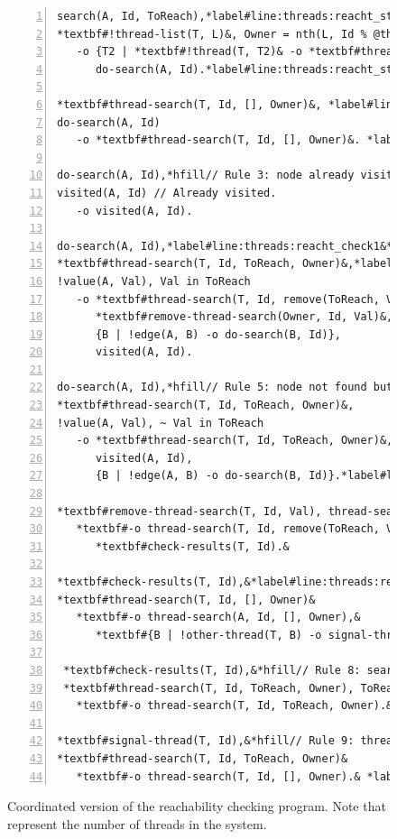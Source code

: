 \begin{figure}[h]
\begin{Verbatim}[numbers=left,fontsize=\codesize,commandchars=*\#\&]
search(A, Id, ToReach),*label#line:threads:reacht_start1&*hfill// Rule 1: initialize search
*textbf#!thread-list(T, L)&, Owner = nth(L, Id % @threads) // Allocate search to a thread.
   -o {T2 | *textbf#!thread(T, T2)& -o *textbf#thread-search(T2, Id, ToReach, Owner)&},*label#line:threads:reacht_threads&
      do-search(A, Id).*label#line:threads:reacht_start2&

*textbf#thread-search(T, Id, [], Owner)&, *label#line:threads:reacht_prune1&*hfill// Rule 2: search completed
do-search(A, Id)
   -o *textbf#thread-search(T, Id, [], Owner)&. *label#line:threads:reacht_prune2&

do-search(A, Id),*hfill// Rule 3: node already visited
visited(A, Id) // Already visited.
   -o visited(A, Id).

do-search(A, Id),*label#line:threads:reacht_check1&*label#line:bfs_join1&*hfill// Rule 4: node found
*textbf#thread-search(T, Id, ToReach, Owner)&,*label#line:threads:reacht_join2&
!value(A, Val), Val in ToReach
   -o *textbf#thread-search(T, Id, remove(ToReach, Val), Owner)&,
      *textbf#remove-thread-search(Owner, Id, Val)&, // Tell owner thread about it.*label#line:threads:reacht_remove&
      {B | !edge(A, B) -o do-search(B, Id)},
      visited(A, Id).

do-search(A, Id),*hfill// Rule 5: node not found but propagate search
*textbf#thread-search(T, Id, ToReach, Owner)&,
!value(A, Val), ~ Val in ToReach
   -o *textbf#thread-search(T, Id, ToReach, Owner)&,
      visited(A, Id),
      {B | !edge(A, B) -o do-search(B, Id)}.*label#line:threads:reacht_check2&

*textbf#remove-thread-search(T, Id, Val), thread-search(T, Id, ToReach, Owner)&*hfill// Rule 6: node found
   *textbf#-o thread-search(T, Id, remove(ToReach, Val), Owner),&
      *textbf#check-results(T, Id).&

*textbf#check-results(T, Id),&*label#line:threads:reacht_reached1&*hfill// Rule 7: search is completed
*textbf#thread-search(T, Id, [], Owner)&
   *textbf#-o thread-search(A, Id, [], Owner),&
      *textbf#{B | !other-thread(T, B) -o signal-thread(B, Id)}.&*label#line:threads:reacht_reached2&

 *textbf#check-results(T, Id),&*hfill// Rule 8: search not completed yet
 *textbf#thread-search(T, Id, ToReach, Owner), ToReach <> []&
   *textbf#-o thread-search(T, Id, ToReach, Owner).&

*textbf#signal-thread(T, Id),&*hfill// Rule 9: thread knows search is done*label#line:threads:reacht_knows1&
*textbf#thread-search(T, Id, ToReach, Owner)&
   *textbf#-o thread-search(T, Id, [], Owner).& *label#line:threads:reacht_knows2&
\end{Verbatim}
\caption{Coordinated version of the reachability checking program. Note
that  represent the number of threads in the system.}
\label{code:threads:reach_threads}
\end{figure}


